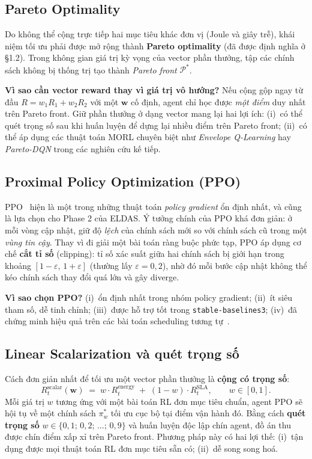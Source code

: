 \subsection{Pareto Optimality}
Do không thể cộng trực tiếp hai mục tiêu khác đơn vị (Joule và giây
trễ), khái niệm tối ưu phải được mở rộng thành \textbf{Pareto
optimality} (đã được định nghĩa ở §1.2). Trong không gian giá trị kỳ
vọng của vector phần thưởng, tập các chính sách không bị thống trị tạo
thành \textit{Pareto front} $\mathcal{P}^*$.

\textbf{Vì sao cần vector reward thay vì giá trị vô hướng?} Nếu cộng gộp
ngay từ đầu $R = w_1 R_1 + w_2 R_2$ với một $\mathbf{w}$ cố định, agent
chỉ học được \emph{một điểm} duy nhất trên Pareto front. Giữ phần
thưởng ở dạng vector mang lại hai lợi ích: (i)~có thể quét trọng số
sau khi huấn luyện để dựng lại nhiều điểm trên Pareto front; (ii)~có
thể áp dụng các thuật toán MORL chuyên biệt như \textit{Envelope
Q-Learning} hay \textit{Pareto-DQN} trong các nghiên cứu kế tiếp.


\subsection{Proximal Policy Optimization (PPO)}
PPO~\cite{schulman2017proximal} hiện là một trong những thuật toán
\textit{policy gradient} ổn định nhất, và cũng là lựa chọn cho Phase 2
của ELDAS. Ý tưởng chính của PPO khá đơn giản: ở mỗi vòng cập nhật, giữ
độ \emph{lệch} của chính sách mới so với chính sách cũ trong một
\textit{vùng tin cậy}. Thay vì đi giải một bài toán ràng buộc phức tạp,
PPO áp dụng cơ chế \textbf{cắt tỉ số} (clipping): tỉ số xác suất giữa
hai chính sách bị giới hạn trong khoảng $[1-\varepsilon,\, 1+\varepsilon]$
(thường lấy $\varepsilon = 0{,}2$), nhờ đó mỗi bước cập nhật không thể
kéo chính sách thay đổi quá lớn và gây diverge.

\textbf{Vì sao chọn PPO?} (i)~ổn định nhất trong nhóm policy gradient;
(ii)~ít siêu tham số, dễ tinh chỉnh; (iii)~được hỗ trợ tốt trong
\texttt{stable-baselines3}; (iv)~đã chứng minh hiệu quả trên các bài
toán scheduling tương
tự~\cite{mao2016resource, decima2019}.

\subsection{Linear Scalarization và quét trọng số}
Cách đơn giản nhất để tối ưu một vector phần thưởng là \textbf{cộng có
trọng số}:
\begin{equation}
  R^{\mathrm{scalar}}_t(\mathbf{w}) \;=\;
    w \cdot R^{\mathrm{energy}}_t \;+\; (1 - w) \cdot R^{\mathrm{SLA}}_t,
  \qquad w \in [0,1].
  \label{eq:linear-scalar}
\end{equation}
Mỗi giá trị $w$ tương ứng với một bài toán RL đơn mục tiêu chuẩn, agent
PPO sẽ hội tụ về một chính sách $\pi_w^*$ tối ưu cục bộ tại điểm vận
hành đó. Bằng cách \textbf{quét trọng số}
$w \in \{0{,}1;\, 0{,}2;\, \dots;\, 0{,}9\}$ và huấn luyện độc lập chín
agent, đồ án thu được chín điểm xấp xỉ trên Pareto front. Phương pháp
này có hai lợi thế: (i)~tận dụng được mọi thuật toán RL đơn mục tiêu
sẵn có; (ii)~dễ song song hoá.

